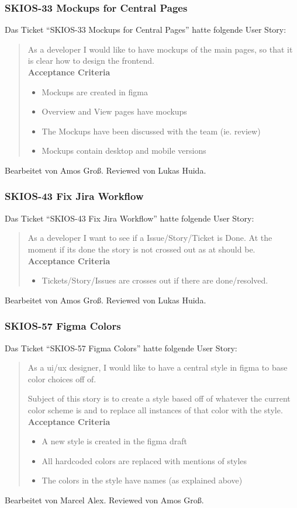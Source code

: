 \subsubsection{SKIOS-33 Mockups for Central Pages}
Das Ticket \enquote{SKIOS-33 Mockups for Central Pages} hatte folgende User Story:
\begin{quotation}
    As a developer I would like to have mockups of the main pages, so that it is clear how to design the frontend. \\
\textbf{Acceptance Criteria}
\begin{itemize}
    \item Mockups are created in figma
    \item Overview and View pages have mockups
    \item The Mockups have been discussed with the team (ie. review)
    \item Mockups contain desktop and mobile versions
\end{itemize}
\end{quotation}
Bearbeitet von Amos Groß.
Reviewed von Lukas Huida.

\subsubsection{SKIOS-43 Fix Jira Workflow}
Das Ticket \enquote{SKIOS-43 Fix Jira Workflow} hatte folgende User Story:
\begin{quotation}
    As a developer I want to see if a Issue/Story/Ticket is Done. At the moment if its done the story is not crossed out as at should be. \\ 
\textbf{Acceptance Criteria}
\begin{itemize}
    \item Tickets/Story/Issues are crosses out if there are done/resolved.
\end{itemize}
\end{quotation}
Bearbeitet von Amos Groß.
Reviewed von Lukas Huida.

\subsubsection{SKIOS-57 Figma Colors}
Das Ticket \enquote{SKIOS-57 Figma Colors} hatte folgende User Story:
\begin{quotation}
    As a ui/ux designer, I would like to have a central style in figma to base color choices off of.

    Subject of this story is to create a style based off of whatever the current color scheme is and to replace all instances of that color with the style. \\

\textbf{Acceptance Criteria}
\begin{itemize}
    \item A new style is created in the figma draft
    \item All hardcoded colors are replaced with mentions of styles
    \item The colors in the style have names (as explained above)
\end{itemize}
\end{quotation}
Bearbeitet von Marcel Alex.
Reviewed von Amos Groß.

